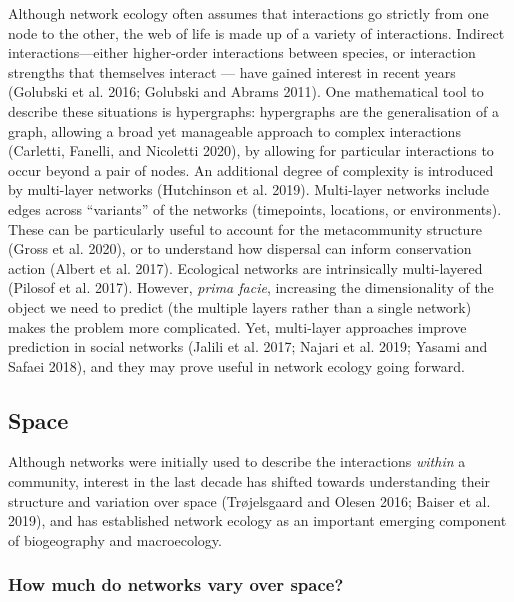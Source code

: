 \documentclass[10pt,oneside]{article}
\begin{document}
Although network ecology often assumes that interactions go strictly
from one node to the other, the web of life is made up of a variety of
interactions. Indirect interactions---either higher-order interactions
between species, or interaction strengths that themselves interact ---
have gained interest in recent years (Golubski et al. 2016; Golubski and
Abrams 2011). One mathematical tool to describe these situations is
hypergraphs: hypergraphs are the generalisation of a graph, allowing a
broad yet manageable approach to complex interactions (Carletti,
Fanelli, and Nicoletti 2020), by allowing for particular interactions to
occur beyond a pair of nodes. An additional degree of complexity is
introduced by multi-layer networks (Hutchinson et al. 2019). Multi-layer
networks include edges across ``variants'' of the networks (timepoints,
locations, or environments). These can be particularly useful to account
for the metacommunity structure (Gross et al. 2020), or to understand
how dispersal can inform conservation action (Albert et al. 2017).
Ecological networks are intrinsically multi-layered (Pilosof et al.
2017). However, \emph{prima facie}, increasing the dimensionality of the
object we need to predict (the multiple layers rather than a single
network) makes the problem more complicated. Yet, multi-layer approaches
improve prediction in social networks (Jalili et al. 2017; Najari et al.
2019; Yasami and Safaei 2018), and they may prove useful in network
ecology going forward.

\hypertarget{space}{%
\subsection{Space}\label{space}}

Although networks were initially used to describe the interactions
\emph{within} a community, interest in the last decade has shifted
towards understanding their structure and variation over space
(Trøjelsgaard and Olesen 2016; Baiser et al. 2019), and has established
network ecology as an important emerging component of biogeography and
macroecology.

\hypertarget{how-much-do-networks-vary-over-space}{%
\subsubsection{How much do networks vary over
space?}\label{how-much-do-networks-vary-over-space}}
\end{document}
